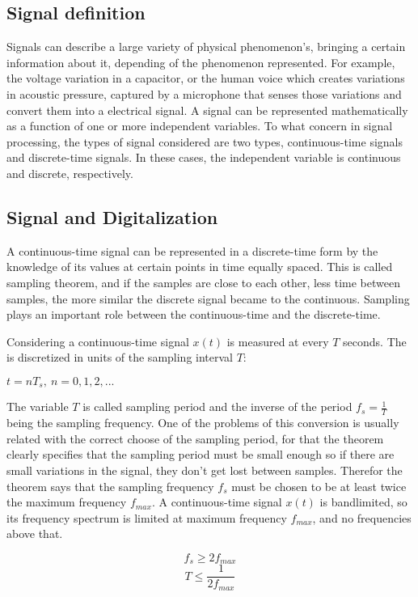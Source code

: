\subsection{Signal definition}
Signals can describe a large variety of physical phenomenon's, bringing a certain information about it, depending of the phenomenon represented. For example, the voltage variation in a capacitor, or the human voice which creates variations in acoustic pressure, captured by a microphone that senses those variations and convert them into a electrical signal. A signal can be represented mathematically as a function of one or more independent variables. 
To what concern in signal processing, the types of signal considered are two types, continuous-time signals and discrete-time signals. In these cases, the independent variable is continuous and discrete, respectively\cite{oppenheimSignalsSystems1997}.

\subsection{Signal and Digitalization}
A continuous-time signal can be represented in a discrete-time form by the knowledge of its values at certain points in time equally spaced. This is called sampling theorem, and if the samples are close to each other, less time between samples, the more similar the discrete signal became to the continuous. Sampling plays an important role between the continuous-time and the discrete-time.

Considering a continuous-time signal $x(t)$ is measured at every $T$ seconds. The is discretized in units of the sampling interval $T$:
\begin{center}
    $t = nT_s,\> n = 0, 1, 2, ...$
\end{center}
The variable $T$ is called sampling period and the inverse of the period $f_s=\frac{1}{T}$ being the sampling frequency. One of the problems of this conversion is usually related with the correct choose of the sampling period, for that the theorem clearly specifies that the sampling period must be small enough so if there are small variations in the signal, they don't get lost between samples. Therefor the theorem says that the sampling frequency $f_s$ must be chosen to be  at least twice the maximum frequency $f_{max}$. A continuous-time signal $x(t)$ is bandlimited, so its frequency spectrum is limited at maximum frequency $f_{max}$, and no frequencies above that.

\begin{equation} \label{eq:sampFreq}
       f_s \geq 2f_{max}
\end{equation}
\begin{equation} \label{eq:sampPeriod}
    T \leq \frac{1}{2f_{max}}
\end{equation}

